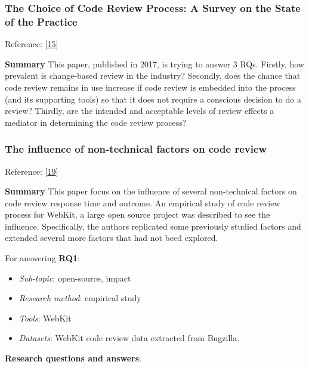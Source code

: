 \documentclass[]{book}
\providecommand{\tightlist}{%
  \setlength{\itemsep}{0pt}\setlength{\parskip}{0pt}}
\begin{document}
\subsubsection{The Choice of Code Review Process: A Survey on the State
of the
Practice}\label{the-choice-of-code-review-process-a-survey-on-the-state-of-the-practice}

Reference: {[}\protect\hyperlink{ref-baum2017choice}{15}{]}

\textbf{Summary} This paper, published in 2017, is trying to answer 3
RQs. Firstly, how prevalent is change-based review in the industry?
Secondly, does the chance that code review remains in use increase if
code review is embedded into the process (and its supporting tools) so
that it does not require a conscious decision to do a review? Thirdly,
are the intended and acceptable levels of review effects a mediator in
determining the code review process?

\subsubsection{The influence of non-technical factors on code
review}\label{the-influence-of-non-technical-factors-on-code-review}

Reference: {[}\protect\hyperlink{ref-baysal2013influence}{19}{]}

\textbf{Summary} This paper focus on the influence of several
non-technical factors on code review response time and outcome. An
empirical study of code review process for WebKit, a large open source
project was described to see the influence. Specifically, the authors
replicated some previously studied factors and extended several more
factors that had not beed explored.

For answering \textbf{RQ1}:

\begin{itemize}
\tightlist
\item
  \emph{Sub-topic}: open-source, impact
\item
  \emph{Research method}: empirical study
\item
  \emph{Tools}: WebKit
\item
  \emph{Datasets}: WebKit code review data extracted from Bugzilla.
\end{itemize}

\textbf{Research questions and answers}:
\end{document}
